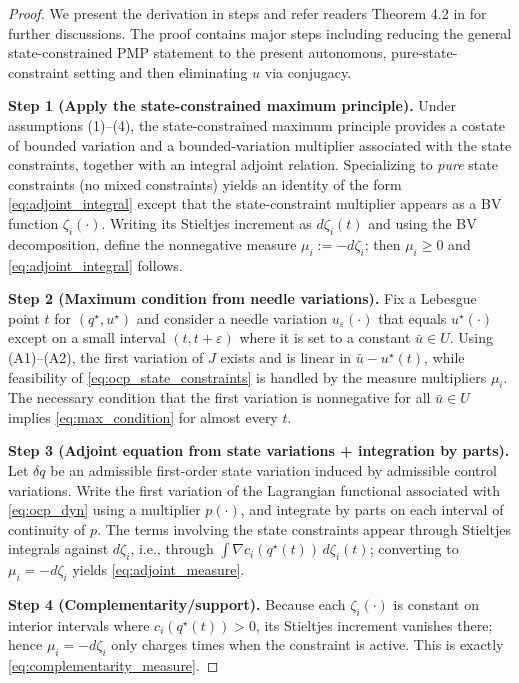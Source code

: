 \documentclass{article} %
\begin{document}
\begin{proof}
We present the derivation in steps and refer readers Theorem 4.2 in \cite{hartl1995survey} for further discussions. The proof contains major steps including reducing the general state-constrained PMP statement
to the present autonomous, pure-state-constraint setting and then eliminating $u$ via conjugacy.

\smallskip
\noindent\textbf{Step 1 (Apply the state-constrained maximum principle).}
Under assumptions (1)--(4), the state-constrained maximum principle provides a costate of bounded variation and
a bounded-variation multiplier associated with the state constraints, together with an integral adjoint relation.
Specializing to \emph{pure} state constraints (no mixed constraints) yields an identity of the form
\cref{eq:adjoint_integral} except that the state-constraint multiplier appears as a BV function $\zeta_i(\cdot)$.
Writing its Stieltjes increment as $d\zeta_i(t)$ and using the BV decomposition, define the nonnegative measure
$\mu_i := -d\zeta_i$; then $\mu_i\ge 0$ and \cref{eq:adjoint_integral} follows.

\smallskip
\noindent\textbf{Step 2 (Maximum condition from needle variations).}
Fix a Lebesgue point $t$ for $(q^\star,u^\star)$ and consider a needle variation
$u_\varepsilon(\cdot)$ that equals $u^\star(\cdot)$ except on a small interval $(t,t+\varepsilon)$ where it is set
to a constant $\bar u\in U$.
Using (A1)--(A2), the first variation of $J$ exists and is linear in $\bar u-u^\star(t)$, while feasibility of
\cref{eq:ocp_state_constraints} is handled by the measure multipliers $\mu_i$.
The necessary condition that the first variation is nonnegative for all $\bar u\in U$ implies
\cref{eq:max_condition} for almost every $t$.

\smallskip
\noindent\textbf{Step 3 (Adjoint equation from state variations + integration by parts).}
Let $\delta q$ be an admissible first-order state variation induced by admissible control variations.
Write the first variation of the Lagrangian functional associated with \cref{eq:ocp_dyn} using a multiplier $p(\cdot)$,
and integrate by parts on each interval of continuity of $p$.
The terms involving the state constraints appear through Stieltjes integrals against $d\zeta_i$, i.e.,
through $\int \nabla c_i(q^\star(t))\,d\zeta_i(t)$; converting to $\mu_i=-d\zeta_i$ yields \cref{eq:adjoint_measure}.

\smallskip
\noindent\textbf{Step 4 (Complementarity/support).}
Because each $\zeta_i(\cdot)$ is constant on interior intervals where $c_i(q^\star(t))>0$,
its Stieltjes increment vanishes there; hence $\mu_i=-d\zeta_i$ only charges times when the constraint is active.
This is exactly \cref{eq:complementarity_measure}.


\end{proof}
\end{document}
